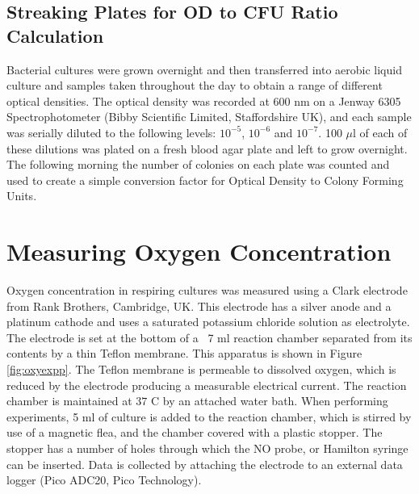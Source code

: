 \subsection{Streaking Plates for OD to CFU Ratio Calculation}
Bacterial cultures were grown overnight and then transferred into aerobic liquid culture and samples taken throughout the day to obtain a range of different optical densities. The optical density was recorded at 600 nm on a Jenway 6305 Spectrophotometer (Bibby Scientific Limited, Staffordshire UK), and each sample was serially diluted to the following levels: $10^{-5}$, $10^{-6}$ and $10^{-7}$. 100 $\mu$l of each of these dilutions was plated on a fresh blood agar plate and left to grow overnight. The following morning the number of colonies on each plate was counted and used to create a simple conversion factor for Optical Density to Colony Forming Units.

\section{Measuring Oxygen Concentration}
Oxygen concentration in respiring cultures was measured using a Clark electrode \cite{Clark1953} from Rank Brothers, Cambridge, UK. This electrode has a silver anode and a platinum cathode and uses a saturated potassium chloride solution as electrolyte. The electrode is set at the bottom of a ~7 ml reaction chamber separated from its contents by a thin Teflon\texttrademark{} membrane. This apparatus is shown in Figure \ref{fig:oxyexpp}. The Teflon\texttrademark{} membrane is permeable to dissolved oxygen, which is reduced by the electrode producing a measurable electrical current. The reaction chamber is maintained at $37$ \textdegree C by an attached water bath.
When performing experiments, 5 ml of culture is added to the reaction chamber, which is stirred by use of a magnetic flea, and the chamber covered with a plastic stopper. The stopper has a number of holes through which the NO probe, or Hamilton syringe can be inserted. Data is collected by attaching the electrode to an external data logger (Pico ADC20, Pico Technology).

